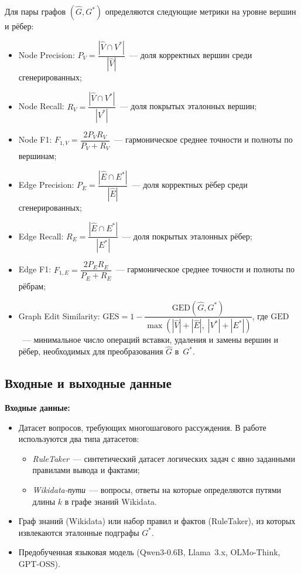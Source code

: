 \begin{definition}
    \label{def:metrics}
    Для пары графов $(\hat{G}, G^*)$ определяются следующие метрики на уровне вершин и рёбер:
    \begin{itemize}
        \item Node Precision: $P_V = \dfrac{|\hat{V} \cap V^*|}{|\hat{V}|}$~--- доля корректных вершин среди сгенерированных;
        \item Node Recall: $R_V = \dfrac{|\hat{V} \cap V^*|}{|V^*|}$~--- доля покрытых эталонных вершин;
        \item Node F1: $F_{1,V} = \dfrac{2 P_V R_V}{P_V + R_V}$~--- гармоническое среднее точности и полноты по вершинам;
        \item Edge Precision: $P_E = \dfrac{|\hat{E} \cap E^*|}{|\hat{E}|}$~--- доля корректных рёбер среди сгенерированных;
        \item Edge Recall: $R_E = \dfrac{|\hat{E} \cap E^*|}{|E^*|}$~--- доля покрытых эталонных рёбер;
        \item Edge F1: $F_{1,E} = \dfrac{2 P_E R_E}{P_E + R_E}$~--- гармоническое среднее точности и полноты по рёбрам;
        \item Graph Edit Similarity: $\text{GES} = 1 - \dfrac{\text{GED}(\hat{G}, G^*)}{\max(|\hat{V}| + |\hat{E}|,\; |V^*| + |E^*|)}$, где $\text{GED}$~--- минимальное число операций вставки, удаления и замены вершин и рёбер, необходимых для преобразования $\hat{G}$ в~$G^*$.
    \end{itemize}
\end{definition}

\subsection{Входные и выходные данные}
\label{subsec:input-output}

\textbf{Входные данные:}
\begin{itemize}
    \item Датасет вопросов, требующих многошагового рассуждения. В работе используются два типа датасетов:
    \begin{itemize}
        \item \textit{RuleTaker}~--- синтетический датасет логических задач с явно заданными правилами вывода и фактами;
        \item \textit{Wikidata-пути}~--- вопросы, ответы на которые определяются путями длины $k$ в графе знаний Wikidata.
    \end{itemize}
    \item Граф знаний (Wikidata) или набор правил и фактов (RuleTaker), из которых извлекаются эталонные подграфы $G^*$.
    \item Предобученная языковая модель (Qwen3-0.6B, Llama~3.x, OLMo-Think, GPT-OSS).
\end{itemize}


